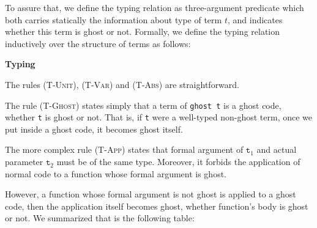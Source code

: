 To assure that, we define the typing relation as three-argument predicate  
 which both carries statically the information about type of term $t$, and indicates whether
this term is ghost or not. Formally, we define the typing relation inductively over the structure of terms as follows:
 
  	 \begin{flushright}  	 \textbf{Typing}  	 \end{flushright}
	
	
	
										{}
										
	{}
										
The rules \textsc{(T-Unit)}, \textsc{(T-Var)} and \textsc{(T-Abs)} are straightforward.

The rule \textsc{(T-Ghost)} states simply that a term of \texttt{ghost t}
is a ghost code, whether \texttt{t} is ghost or not. That is, if \texttt{t} were a well-typed non-ghost term, once we put inside a ghost code, it becomes ghost itself. 

The more complex rule \textsc{(T-App)} states that formal argument of $\texttt{t}_{1}$ and actual parameter $\texttt{t}_{2}$ must be
of the same type. Moreover, it forbids the application of normal code
to a function whose formal argument is ghost.  

However, a function whose formal argument is not ghost is applied to a 
ghost code, then the application itself becomes ghost, whether function's
body is ghost or not. We summarized that is the following table:

